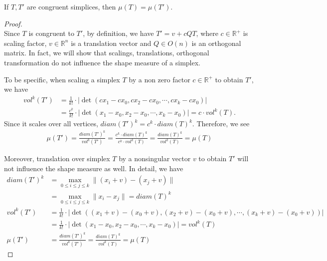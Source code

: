     \begin{lemma*}
    If $T, T'$ are congruent simplices, then $\mu(T) = \mu(T')$.
    \end{lemma*}
    \begin{proof}\mbox{}\\
    Since $T$ is congruent to $T'$, by definition, we have $T' = v + cQT$, where $c\in\mathbb{R}^{+}$ is scaling factor, $v\in\mathbb{R}^n$ is a translation vector and $Q\in O(n)$ is an orthogonal matrix. In fact, we will show that scalings, translations, orthogonal transformation do not influence the shape measure of a simplex. 
    
    To be specific, when scaling a simplex $T$ by a non zero factor $c\in\mathbb{R}^{+}$ to obtain $T'$, we have 
    \begin{align*}
     vol^k(T') &= \frac{1}{k!}\cdot|\det(cx_1-cx_0, cx_2-cx_0,\cdots, cx_k-cx_0)| \\
               &= \frac{c^k}{k!}\cdot|\det(x_1-x_0, x_2-x_0,\cdots, x_k-x_0)| = c\cdot vol^k(T).
    \end{align*}
    Since it scales over all vertices, $diam(T')^k = c^k\cdot diam(T)^k$. Therefore, we see
    \begin{align*}
    \mu(T') = \frac{diam(T')^k}{vol^k(T')} = \frac{c^k\cdot diam(T)^k}{c^k\cdot vol^k(T)} = \frac{diam(T)^k}{vol^k(T)} = \mu(T)
    \end{align*}

    Moreover, translation over simplex $T$ by a nonsingular vector $v$ to obtain $T'$ will not influence the shape measure as well. In detail, we have
    \begin{align*}
    diam(T')^k &= \max_{0\leqslant i\leqslant j\leqslant k} \|(x_i + v) - (x_j + v)\|\\ 
               &= \max_{0\leqslant i\leqslant j\leqslant k}\|x_i - x_j\| = diam(T)^k \\
    vol^k(T') &= \frac{1}{k!}\cdot|\det((x_1+v) - (x_0+v), (x_2+v)-(x_0+v),\cdots,(x_k+v)-(x_0+v))|\\
              &= \frac{1}{k!}\cdot|\det(x_1-x_0, x_2-x_0,\cdots, x_k-x_0)| = vol^k(T)\\
    \mu(T') &= \frac{diam(T')^k}{vol^k(T')} = \frac{diam(T)^k}{vol^k(T)} = \mu(T)
    \end{align*}


\end{proof}
